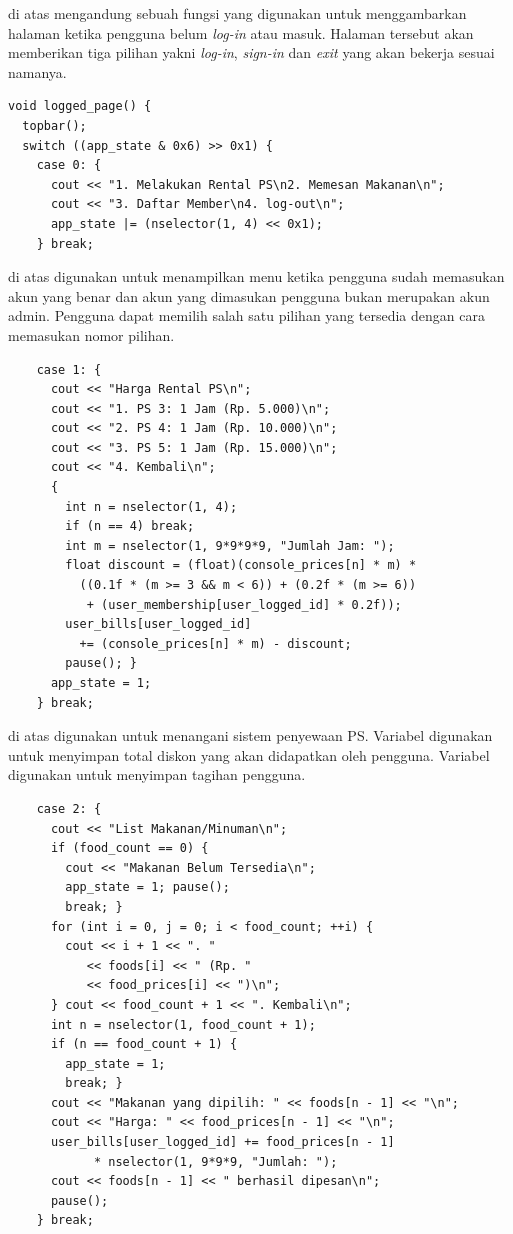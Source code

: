 \documentclass[../main.tex]{subfiles}
\begin{document}
{\Script} di atas mengandung sebuah fungsi yang digunakan untuk menggambarkan halaman ketika pengguna belum \textit{log-in} atau masuk. Halaman tersebut akan memberikan tiga pilihan yakni \textit{log-in}, \textit{sign-in} dan \textit{exit} yang akan bekerja sesuai namanya.

\begin{code}
\begin{verbatim}
void logged_page() {
  topbar();
  switch ((app_state & 0x6) >> 0x1) {
    case 0: {
      cout << "1. Melakukan Rental PS\n2. Memesan Makanan\n";
      cout << "3. Daftar Member\n4. log-out\n";
      app_state |= (nselector(1, 4) << 0x1);
    } break;
\end{verbatim}
\end{code}

{\Script} di atas digunakan untuk menampilkan menu ketika pengguna sudah memasukan akun yang benar dan akun yang dimasukan pengguna bukan merupakan akun admin. Pengguna dapat memilih salah satu pilihan yang tersedia dengan cara memasukan nomor pilihan.

\begin{code}
\begin{verbatim}
    case 1: {
      cout << "Harga Rental PS\n";
      cout << "1. PS 3: 1 Jam (Rp. 5.000)\n";
      cout << "2. PS 4: 1 Jam (Rp. 10.000)\n";
      cout << "3. PS 5: 1 Jam (Rp. 15.000)\n";
      cout << "4. Kembali\n";
      {
        int n = nselector(1, 4);
        if (n == 4) break;
        int m = nselector(1, 9*9*9*9, "Jumlah Jam: ");
        float discount = (float)(console_prices[n] * m) *
          ((0.1f * (m >= 3 && m < 6)) + (0.2f * (m >= 6))
           + (user_membership[user_logged_id] * 0.2f));
        user_bills[user_logged_id]
          += (console_prices[n] * m) - discount;
        pause(); }
      app_state = 1;
    } break;
\end{verbatim}
\end{code}

{\Script} di atas digunakan untuk menangani sistem penyewaan PS. Variabel  digunakan untuk menyimpan total diskon yang akan didapatkan oleh pengguna. Variabel  digunakan untuk menyimpan tagihan pengguna.

\begin{code}
\begin{verbatim}
    case 2: {
      cout << "List Makanan/Minuman\n";
      if (food_count == 0) {
        cout << "Makanan Belum Tersedia\n";
        app_state = 1; pause();
        break; }
      for (int i = 0, j = 0; i < food_count; ++i) {
        cout << i + 1 << ". "
           << foods[i] << " (Rp. "
           << food_prices[i] << ")\n";
      } cout << food_count + 1 << ". Kembali\n";
      int n = nselector(1, food_count + 1);
      if (n == food_count + 1) {
        app_state = 1;
        break; }
      cout << "Makanan yang dipilih: " << foods[n - 1] << "\n";
      cout << "Harga: " << food_prices[n - 1] << "\n";
      user_bills[user_logged_id] += food_prices[n - 1]
            * nselector(1, 9*9*9, "Jumlah: ");
      cout << foods[n - 1] << " berhasil dipesan\n";
      pause();
    } break;
\end{verbatim}
\end{code}
\end{document}
